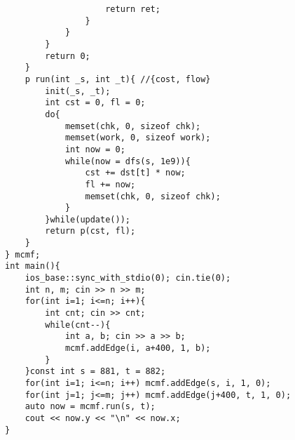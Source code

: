 \documentclass[landscape, 8pt, a4paper, oneside, twocolumn]{extarticle}
\begin{document}
\begin{verbatim}
                    return ret;
                }
            }
        }
        return 0;
    }
    p run(int _s, int _t){ //{cost, flow}
        init(_s, _t);
        int cst = 0, fl = 0;
        do{
            memset(chk, 0, sizeof chk);
            memset(work, 0, sizeof work);
            int now = 0;
            while(now = dfs(s, 1e9)){
                cst += dst[t] * now;
                fl += now;
                memset(chk, 0, sizeof chk);
            }
        }while(update());
        return p(cst, fl);
    }
} mcmf;
int main(){
    ios_base::sync_with_stdio(0); cin.tie(0);
    int n, m; cin >> n >> m;
    for(int i=1; i<=n; i++){
        int cnt; cin >> cnt;
        while(cnt--){
            int a, b; cin >> a >> b;
            mcmf.addEdge(i, a+400, 1, b);
        }
    }const int s = 881, t = 882;
    for(int i=1; i<=n; i++) mcmf.addEdge(s, i, 1, 0);
    for(int j=1; j<=m; j++) mcmf.addEdge(j+400, t, 1, 0);
    auto now = mcmf.run(s, t);
    cout << now.y << "\n" << now.x;
}
\end{verbatim}
\end{document}
